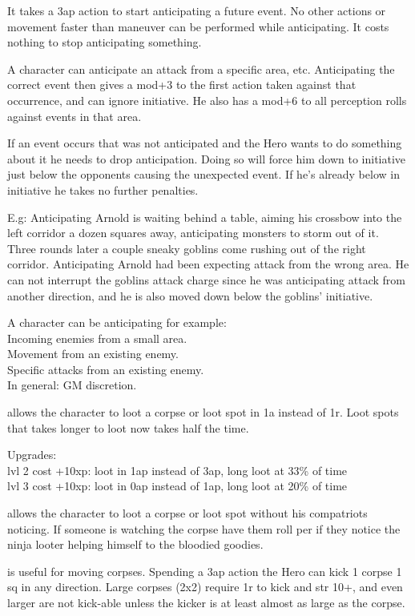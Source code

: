 It takes a 3ap action to start anticipating a future event. No other actions or movement faster than maneuver can be performed while anticipating. It costs nothing to stop anticipating something.

A character can anticipate an attack from a specific area, etc. Anticipating the correct event then gives a mod+3 to the first action taken against that occurrence, and can ignore initiative. He also has a mod+6 to all perception rolls against events in that area.

If an event occurs that was not anticipated and the Hero wants to do something about it he needs to drop anticipation. Doing so will force him down to initiative just below the opponents causing the unexpected event. If he's already below in initiative he takes no further penalties.

E.g: Anticipating Arnold is waiting behind a table, aiming his crossbow into the left corridor a dozen squares away, anticipating monsters to storm out of it. Three rounds later a couple sneaky goblins come rushing out of the right corridor. Anticipating Arnold had been expecting attack from the wrong area. He can not interrupt the goblins attack charge since he was anticipating attack from another direction, and he is also moved down below the goblins' initiative.

A character can be anticipating for example: \\
Incoming enemies from a small area. \\
Movement from an existing enemy. \\
Specific attacks from an existing enemy. \\
In general: GM discretion.


 allows the character to loot a corpse or loot spot in 1a instead of 1r. Loot spots that takes longer to loot now takes half the time.

Upgrades:\\
lvl 2 cost +10xp: loot in 1ap instead of 3ap, long loot at 33\% of time\\
lvl 3 cost +10xp: loot in 0ap instead of 1ap, long loot at 20\% of time


 allows the character to loot a corpse or loot spot without his compatriots noticing. If someone is watching the corpse have them roll per if they notice the ninja looter helping himself to the bloodied goodies.


 is useful for moving corpses. Spending a 3ap action the Hero can kick 1 corpse 1 sq in any direction. Large corpses (2x2) require 1r to kick and str 10+, and even larger are not kick-able unless the kicker is at least almost as large as the corpse.


